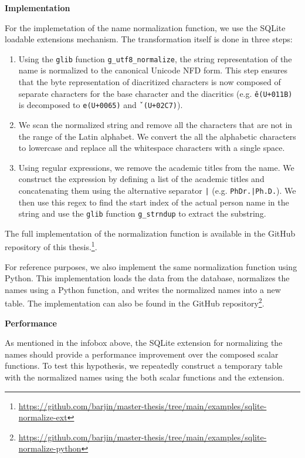\textbf{Implementation}

For the implemetation of the name normalization function, we use the SQLite loadable extensions mechanism.
The transformation itself is done in three steps:

\begin{enumerate}
    \item Using the \texttt{glib} function \texttt{g\_utf8\_normalize}, the string representation of the name is normalized to the canonical Unicode \ac{NFD} form.
    This step ensures that the byte representation of diacritized characters is now composed of separate characters for the base character and the diacritics (e.g. \texttt{ě}\texttt{(U+011B)} is decomposed to \texttt{e}\texttt{(U+0065)} and \texttt{ˇ}\texttt{(U+02C7)}).
    \item We scan the normalized string and remove all the characters that are not in the range of the Latin alphabet. We convert the all the 
    alphabetic characters to lowercase and replace all the whitespace characters with a single space.
    \item Using regular expressions, we remove the academic titles from the name. 
    We construct the expression by defining a list of the academic titles and concatenating them using the alternative separator \texttt{|} (e.g. \texttt{PhDr.|Ph.D.}).
    We then use this regex to find the start index of the actual person name in the string
    and use the \texttt{glib} function \texttt{g\_strndup} to extract the substring.
\end{enumerate}

The full implementation of the normalization function is available in the GitHub repository of this thesis.\footnote{\url{https://github.com/barjin/master-thesis/tree/main/examples/sqlite-normalize-ext}}.

For reference purposes, we also implement the same normalization function using Python.
This implementation loads the data from the database, normalizes the names using a Python function, and writes the normalized names into a new table.
The implementation can also be found in the GitHub repository\footnote{\url{https://github.com/barjin/master-thesis/tree/main/examples/sqlite-normalize-python}}.

\textbf{Performance}

As mentioned in the infobox above, the SQLite extension for normalizing the names should provide a performance improvement over the composed scalar functions.
To test this hypothesis, we repeatedly construct a temporary table with the normalized names using the both scalar functions and the extension.

